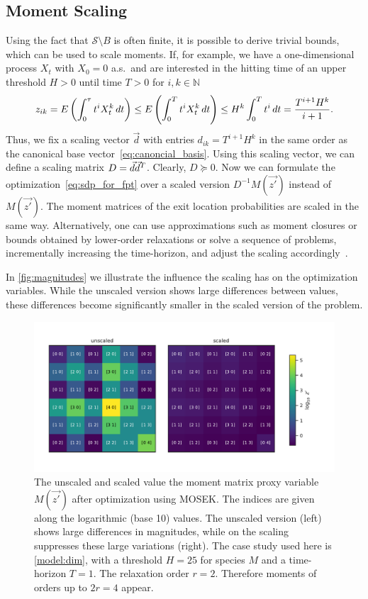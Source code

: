 \subsection{Moment Scaling}\label{sec:mfpt:scaling}
Using the fact that
$\mathcal{S}\setminus {B}$ is often finite,
it is possible to derive trivial bounds, which can be used to scale moments.
If, for example, we have a one-dimensional process $X_t$ with $X_0 = 0$ a.s.\ and are interested in the hitting
time of an upper threshold $H>0$ until time $T>0$ for $i,k\in \mathbb N$
$$
z_{ik} = {E}\left(\int_0^{\tau}t^i X_t^k\,dt\right)\leq{E}\left(\int_0^T t^i X_t^k\,dt\right)\leq H^k\int_0^T t^i\,dt
=\frac{T^{i+1}H^k}{i+1}.$$
Thus, we fix a scaling vector $\vec d$ with entries $d_{ik}={T^{i+1}H^k}$ in
the same order
as the canonical base vector~\eqref{eq:canoncial_basis}.
Using this scaling vector, we can define a scaling
matrix $D={\vec d}{\vec{d}}^{T}$.
Clearly, $D \succeq 0$.
Now we can formulate the optimization~\eqref{eq:sdp_for_fpt}
over a scaled version $D^{-1}M(\vec{z'})$ instead of $M(\vec{z'})$.
The moment matrices of the exit location probabilities are scaled in the same
way.
Alternatively, one can use approximations such as moment closures
or bounds obtained by lower-order relaxations or solve a sequence
of problems, incrementally increasing
the time-horizon, and adjust the scaling accordingly~\cite{dowdy2018dynamic}.

In \autoref{fig:magnitudes} we illustrate the influence the scaling has on the
optimization variables. While the unscaled version shows large differences
between values, these differences become significantly smaller in the scaled version
of the problem.
\begin{figure}[htb]
    \centering
    \includegraphics[scale=0.65]{gfx/magnitudes.pdf}
    \caption{The unscaled and scaled value the moment matrix proxy variable
    $M(\vec{z'})$ after optimization using MOSEK. The indices are given along the
    logarithmic (base 10) values. The unscaled version (left) shows large
    differences in magnitudes, while on the scaling suppresses
    these large variations (right). The case study used here is \autoref{model:dim},
    with a threshold $H=25$ for species $M$ and a time-horizon $T=1$. The
    relaxation order $r=2$. Therefore moments of orders up to $2r=4$ appear.}
    \label{fig:magnitudes}
\end{figure}


